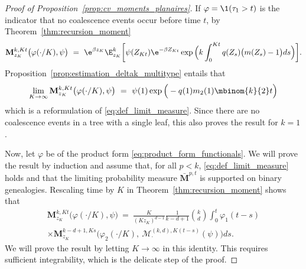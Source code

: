 \begin{refsegment}
\begin{proof}[Proof of Proposition~\ref{prop:cv_moments_planaires}]
If $\varphi = \1(\tau_1 > t)$ is the indicator that no coalescence events
occur before time $t$, by Theorem~\ref{thm:recursion_moment}
\[
    \mathbf{M}_{z_K}^{k,Kt}\big(\varphi(\cdot/K), \psi\big)\ = \
    \e^{\beta z_K}\E^k_{z_K}\bigg[ 
        \psi(Z_{Kt})\e^{-\beta Z_{Kt}}\exp\Big(k\int_0^{Kt} q(Z_s) 
        \big(m(Z_s)-1\big) ds \Big)
    \bigg].
\]
Proposition~\ref{prop:estimation_deltak_multitype} entails that
\begin{equation} \label{eq:limit_base_case}
    \lim_{K \to \infty} \mathbf{M}_{z_K}^{k,Kt}\big(\varphi(\cdot/K), \psi\big) 
  \  =\ \psi(1) \exp\Big(-q(1)m_2(1)\mbinom{k}{2}t\Big)
\end{equation}
which is a reformulation of \eqref{eq:def_limit_measure}. Since there are
no coalescence events in a tree with a single leaf, this also proves the
result for $k=1$.

Now, let $\varphi$ be of the product form \eqref{eq:product_form_functionals}.
We will prove the result by induction and assume that, for all $p < k$, 
\eqref{eq:def_limit_measure} holds and that the limiting probability
measure $\mathbf{\bar{M}}^{p,t}$ is supported on binary genealogies. Rescaling time by $K$ in
Theorem~\ref{thm:recursion_moment} shows that 
\begin{multline}\label{eq:rec_before_limit}
    \mathbf{M}^{k,Kt}_{z_K}\big(\varphi( \cdot/K),\psi\big)
    \ =\ 
    \frac{K}{(Kz_K)^{d-1}}\frac{1}{k-d+1}\binom{k}{d}\int_0^{t} \varphi_1(t-s)\\
    \times\mathbf{M}^{k-d+1,Ks}_{z_K}\Big(
        {\varphi}_2(\cdot/K),\ \mathcal{M}^{(k,d),K(t-s)}_{\cdot}(\psi)
    \Big) ds.
\end{multline}
We will prove the result by letting $K \to \infty$ in this identity.
This requires sufficient integrability, which is the delicate step of
the proof.


\end{proof}
\end{refsegment}
